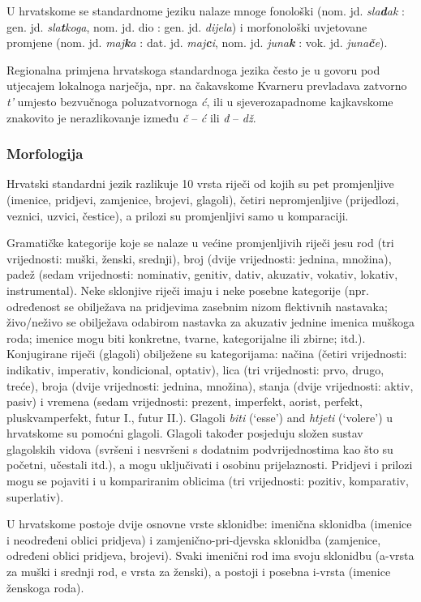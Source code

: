 \begin{multicols}{2}
U hrvatskome se standardnome jeziku nalaze mnoge fonološki (nom. jd. \emph{sla\textbf{d}ak} : gen. jd. \emph{sla\textbf{t}koga}, nom. jd. dio : gen. jd. \emph{dijela}) i morfonološki uvjetovane promjene (nom. jd. \emph{maj\textbf{k}a} : dat. jd. \emph{maj\textbf{c}i}, nom. jd. \emph{juna\textbf{k}} : vok. jd. \emph{juna\textbf{č}e}).

Regionalna primjena hrvatskoga standardnoga jezika često je u govoru pod utjecajem lokalnoga narječja, npr. na čakavskome Kvarneru prevladava zatvorno \emph{t'} umjesto bezvučnoga poluzatvornoga \emph{ć}, ili u sjeverozapadnome kajkavskome znakovito je nerazlikovanje između \emph{č} – \emph{ć} ili \emph{đ} – \emph{dž}.


\subsubsection{Morfologija}

Hrvatski standardni jezik razlikuje 10 vrsta riječi od kojih su pet promjenljive (imenice, pridjevi, zamjenice, brojevi, glagoli), četiri nepromjenljive (prijedlozi, veznici, uzvici, čestice), a prilozi su promjenljivi samo u komparaciji.

Gramatičke kategorije koje se nalaze u većine promjenljivih riječi jesu rod (tri vrijednosti: muški, ženski, srednji), broj (dvije vrijednosti: jednina, množina), padež (sedam vrijednosti: nominativ, genitiv, dativ, akuzativ, vokativ, lokativ, instrumental). Neke sklonjive riječi imaju i neke posebne kategorije (npr. određenost se obilježava na pridjevima zasebnim nizom flektivnih nastavaka; živo/neživo se obilježava odabirom nastavka za akuzativ jednine imenica muškoga roda; imenice mogu biti konkretne, tvarne, kategorijalne ili zbirne; itd.). Konjugirane riječi (glagoli) obilježene su kategorijama: načina (četiri vrijednosti: indikativ, imperativ, kondicional, optativ), lica (tri vrijednosti: prvo, drugo, treće), broja (dvije vrijednosti: jednina, množina), stanja (dvije vrijednosti: aktiv, pasiv) i vremena (sedam vrijednosti: prezent, imperfekt, aorist, perfekt, pluskvamperfekt, futur I., futur II.). Glagoli \emph{biti} (‘esse’) and \emph{htjeti} (‘volere’) u hrvatskome su pomoćni glagoli. Glagoli također posjeduju složen sustav glagolskih vidova (svršeni i nesvršeni s dodatnim podvrijednostima kao što su početni, učestali itd.), a mogu uključivati i osobinu prijelaznosti. Pridjevi i prilozi mogu se pojaviti i u kompariranim oblicima (tri vrijednosti: pozitiv, komparativ, superlativ).

U hrvatskome postoje dvije osnovne vrste sklonidbe: imenična sklonidba (imenice i neodređeni oblici pridjeva) i zamjenično-pri-djevska sklonidba (zamjenice, određeni oblici pridjeva, brojevi). Svaki imenični rod ima svoju sklonidbu (a-vrsta za muški i srednji rod, e vrsta za ženski), a postoji i posebna i-vrsta (imenice ženskoga roda).


\end{multicols}
